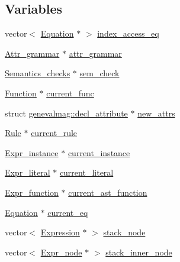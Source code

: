 \subsection*{Variables}
\begin{CompactItemize}
\item 
vector$<$ \hyperlink{classgenevalmag_1_1Equation}{Equation} $\ast$ $>$ \hyperlink{namespacegenevalmag_4bc1208b99175d15ec86291f80f5428f}{index\_\-access\_\-eq}
\item 
\hyperlink{classgenevalmag_1_1Attr__grammar}{Attr\_\-grammar} $\ast$ \hyperlink{namespacegenevalmag_85aabf29d2f206619e2d128154283336}{attr\_\-grammar}
\item 
\hyperlink{classgenevalmag_1_1Semantics__checks}{Semantics\_\-checks} $\ast$ \hyperlink{namespacegenevalmag_d93efa78140ac10eefb71fdb44c48b6b}{sem\_\-check}
\item 
\hyperlink{classgenevalmag_1_1Function}{Function} $\ast$ \hyperlink{namespacegenevalmag_910b57b31dc9d8772d89a082d88f0c50}{current\_\-func}
\item 
struct \hyperlink{structgenevalmag_1_1decl__attribute}{genevalmag::decl\_\-attribute} $\ast$ \hyperlink{namespacegenevalmag_3564619b24ff1e9243dee9e501181679}{new\_\-attrs}
\item 
\hyperlink{classgenevalmag_1_1Rule}{Rule} $\ast$ \hyperlink{namespacegenevalmag_fc4896526f13792a5f56fa1c254759d4}{current\_\-rule}
\item 
\hyperlink{classgenevalmag_1_1Expr__instance}{Expr\_\-instance} $\ast$ \hyperlink{namespacegenevalmag_4e01071642cc57ba91fe84d929195c7c}{current\_\-instance}
\item 
\hyperlink{classgenevalmag_1_1Expr__literal}{Expr\_\-literal} $\ast$ \hyperlink{namespacegenevalmag_09a13d15a03643602e801cf36685ede0}{current\_\-literal}
\item 
\hyperlink{classgenevalmag_1_1Expr__function}{Expr\_\-function} $\ast$ \hyperlink{namespacegenevalmag_5d3b27c53cfad3c612dc56f1750c44a2}{current\_\-ast\_\-function}
\item 
\hyperlink{classgenevalmag_1_1Equation}{Equation} $\ast$ \hyperlink{namespacegenevalmag_d81ea3b166738b52ec4a3b7ac291e64b}{current\_\-eq}
\item 
vector$<$ \hyperlink{classgenevalmag_1_1Expression}{Expression} $\ast$ $>$ \hyperlink{namespacegenevalmag_47998af84055c40ecfcdfe156f71be04}{stack\_\-node}
\item 
vector$<$ \hyperlink{classgenevalmag_1_1Expr__node}{Expr\_\-node} $\ast$ $>$ \hyperlink{namespacegenevalmag_0b445db6f5f211e8d78b693596cbda3c}{stack\_\-inner\_\-node}
\end{CompactItemize}


